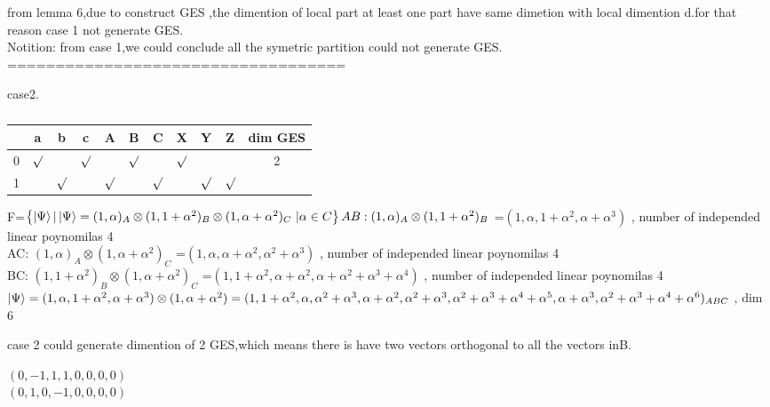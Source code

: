 \documentclass[12pt,twoside]{report}
\begin{document}
   from lemma 6,due to construct GES ,the dimention of local part at least one part have same dimetion with local dimention d.for that reason case 1 not generate GES.\\
   
   
  Notition: from case 1,we could conclude all the symetric partition  could not generate GES.\\
  
  ===================================
  
  case2.
  
  \begin{table}[ht]
  	\centering
  	\begin{tabular}{|c|c|c|c|c|c|c|c|c|c|c|}
  		\hline
  		& a & b  &  c & A & B & C & X & Y & Z & dim GES  \\
  		\hline
  		0	& $\surd$&  &$\surd$ & &$\surd$ & &$\surd$ & &  & 2\\
  		\hline
  		1 &	&$\surd$ & & $\surd$& &$\surd$ & &$\surd$ & $\surd$ &\\
  		\hline 		
  	\end{tabular}
  	\caption{}
  \end{table}
  
  F=$ \left\lbrace {\Ket{\Psi}|\ket{\Psi}=(1,\alpha)_{A}\otimes(1,1+\alpha^{2})_{B}\otimes(1,\alpha+\alpha^{2})_{C}}  \ |\alpha\in C\right\rbrace  
  \\
  AB:  (1,\alpha)_{A}\otimes(1,1+\alpha^{2})_{B}$ =$ (1,\alpha,1+\alpha^{2},\alpha+\alpha^{3})$  ,  number of independed linear poynomilas  4  \\
  AC:   $(1,\alpha)_{A}\otimes(1,\alpha+\alpha^{2})_{C}$ =$ (1,\alpha,\alpha+\alpha^{2},\alpha^{2}+\alpha^{3})$  ,  number of independed linear poynomilas  4  \\
  BC:  $(1,1+\alpha^{2})_{B} \otimes(1,\alpha+\alpha^{2})_{C}$ =$ (1,1+\alpha^{2},\alpha+\alpha^{2},\alpha+\alpha^{2}+\alpha^{3}+\alpha^{4})$  ,  number of independed linear poynomilas  4  \\
  

  $ \ket{\Psi}=(1,\alpha,1+\alpha^{2},\alpha+\alpha^{3})\otimes (1,\alpha+\alpha^{2}) =(1,1+\alpha^{2},\alpha,\alpha^{2}+\alpha^{3},\alpha+\alpha^{2},\alpha^{2}+\alpha^{3},\alpha^{2}+\alpha^{3}+\alpha^{4}+\alpha^{5},\alpha+\alpha^{3},\alpha^{2}+\alpha^{3}+\alpha^{4}+\alpha^{6})_{ABC}$   , dim 6
  
  
  case 2 could generate  dimention of 2 GES,which means there is have two vectors orthogonal to all the vectors inB.\\
  \begin{center}
	$ (0,-1,1,1,0,0,0,0) $\\
$ (0,1,0,-1,0,0,0,0) $
  \end{center}
\end{document}
